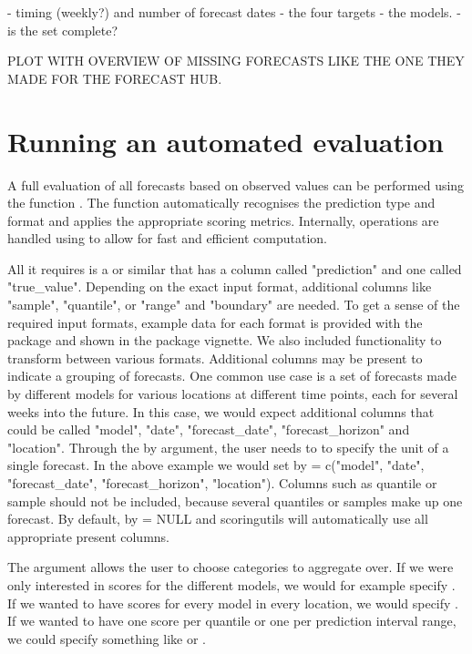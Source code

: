 \documentclass[article]{jss}
\begin{document}
- timing (weekly?) and number of forecast dates
- the four targets
- the models. 
- is the set complete? 

PLOT WITH OVERVIEW OF MISSING FORECASTS LIKE THE ONE THEY MADE FOR THE FORECAST HUB. 

\section[run-evaluation]{Running an automated evaluation}
A full evaluation of all forecasts based on observed values can be performed using the function . The function automatically recognises the prediction type and format and applies the appropriate scoring metrics. Internally, operations are handled using  to allow for fast and efficient computation. 

All it requires is a  or similar that has a column called "prediction" and one called "true\_value". Depending on the exact input format, additional columns like "sample", "quantile", or "range" and "boundary" are needed. To get a sense of the required input formats, example data for each format is provided with the package and shown in the package vignette. We also included functionality to transform between various formats. Additional columns may be present to indicate a grouping of forecasts. One common use case is a set of forecasts made by different models for various locations at different time points, each for several weeks into the future. In this case, we would expect additional columns that could be called "model", "date", "forecast\_date", "forecast\_horizon" and "location". Through the by argument, the user needs to to specify the unit of a single forecast. In the above example we would set by = c("model", "date", "forecast\_date", "forecast\_horizon", "location"). Columns such as quantile or sample should not be included, because several quantiles or samples make up one forecast. By default, by = NULL and scoringutils will automatically use all appropriate present columns. 

The  argument allows the user to choose categories to aggregate over. If we were only interested in scores for the different models, we would for example specify . If we wanted to have scores for every model in every location, we would specify . If we wanted to have one score per quantile or one per prediction interval range, we could specify something like  or . 
\end{document}
